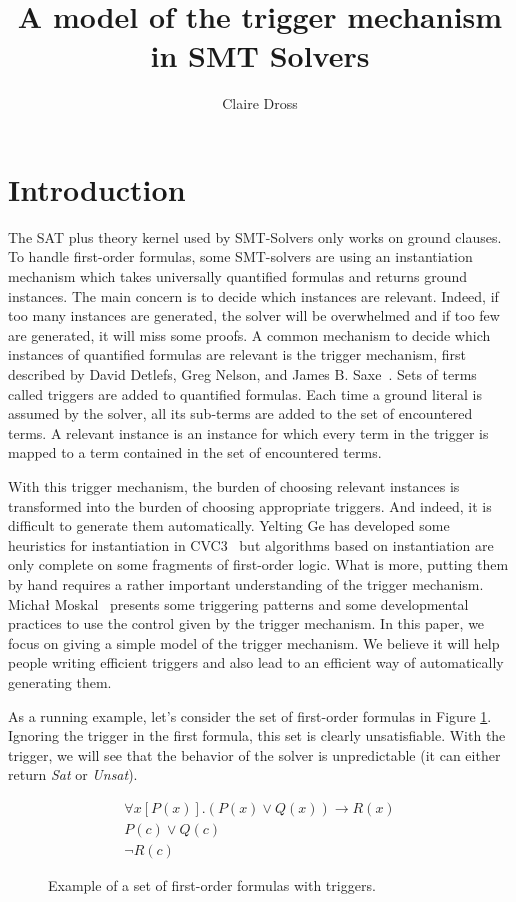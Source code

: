 \documentclass[a4paper,11pt]{article}
\title{A model of the trigger mechanism in SMT Solvers}
\author{Claire Dross}
\begin{document}
\maketitle

\section{Introduction}
The SAT plus theory kernel used by SMT-Solvers only works on ground clauses. To handle first-order formulas,
some SMT-solvers are using an instantiation mechanism
which takes universally quantified formulas and returns ground instances. The main concern is to
decide which instances are relevant. Indeed, if too many instances are generated, the solver will be
overwhelmed and if too few are generated, it will miss some proofs. A common mechanism to decide
which instances of quantified formulas are relevant is the trigger mechanism, first described
by David Detlefs, Greg Nelson, and James B. Saxe~\cite{simplify}.
Sets of terms called triggers are added to quantified formulas.
Each time a ground literal is assumed by the solver, all its sub-terms are
added to the set of encountered terms. A relevant instance is an instance for which every term
in the trigger is mapped to a term contained in the set of encountered terms.

With this trigger mechanism, the burden of choosing relevant instances is transformed into the
burden of choosing appropriate triggers. And indeed, it is difficult to generate them
automatically. Yelting Ge has developed some heuristics for instantiation in CVC3~\cite{Ge-2010}
but algorithms based on instantiation are only complete on some fragments of first-order logic.
What is more, putting them by hand requires a rather important understanding of the
trigger mechanism. Micha\l{} Moskal~\cite{moskal-2009} presents some triggering patterns and some
developmental practices to use the control given by the trigger mechanism.
In this paper, we focus on giving a simple model of the trigger mechanism.
We believe it will help people writing efficient triggers and also lead to an efficient way
of automatically generating them.

As a running example, let's consider the set of first-order formulas in Figure \ref{fo-ex}.
Ignoring the trigger in the first formula, this set is clearly unsatisfiable. With the trigger,
we will see that the behavior of the solver is unpredictable (it can either return \emph{Sat}
or \emph{Unsat}).
\begin{figure}
 \begin{eqnarray*}
 \forall x[P(x)]. (P(x)\vee Q(x))\rightarrow R(x)\\
 P(c)\vee Q(c)\\
 \neg R(c)
\end{eqnarray*}
\caption{\label{fo-ex}Example of a set of first-order formulas with triggers.}
\end{figure}
\end{document}
